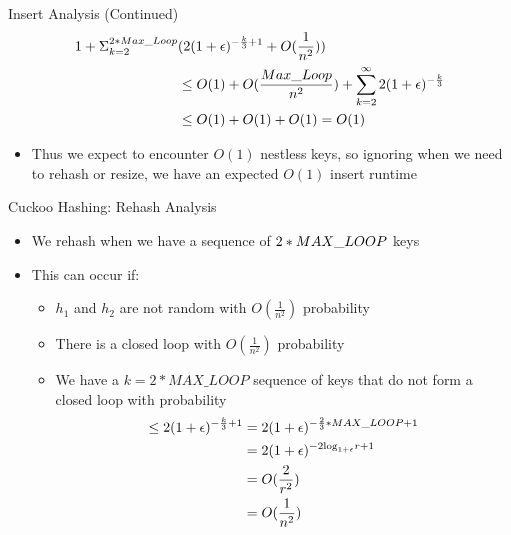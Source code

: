 \documentclass[aspectratio=169]{beamer}
\begin{document}
\begin{frame}{Insert Analysis (Continued)}
    \begin{align*}
        1 + \Sigma_{k = 2}^{2 * \emph{Max\_Loop}} &(2(1 + \epsilon)^{-\frac k 3 + 1} + O(\frac 1 {n^2})) \\
        &\le O(1) + O(\frac{\emph{Max\_Loop}}{n^2}) + \sum_{k = 2}^{\infty} 2(1 + \epsilon)^{-\frac k 3} \\
        &\le O(1) + O(1) + O(1) = O(1)
    \end{align*} \pause
    \begin{itemize}
        \item Thus we expect to encounter $O(1)$ nestless keys, so ignoring when we need to rehash or resize, we have an expected $O(1)$ insert runtime
    \end{itemize}
\end{frame}

\begin{frame}{Cuckoo Hashing: Rehash Analysis}
    \begin{itemize}
        \item We rehash when we have a sequence of $2 * \emph{MAX\_LOOP}$ keys
        \item This can occur if:
        \begin{itemize}
            \item $h_1$ and $h_2$ are not random with $O(\frac 1 {n^2})$ probability \pause
            \item There is a closed loop with $O(\frac 1 {n^2})$ probability \pause
            \item We have a $k = 2 * {MAX\_LOOP}$ sequence of keys that do not form a closed loop with probability
            \begin{align*}
                \le 2(1 + \epsilon)^{-\frac k 3 + 1} &= 2(1 + \epsilon)^{- \frac 2 3 * \emph{MAX\_LOOP} + 1} \\
                &= 2(1 + \epsilon)^{-2 \text{log}_{1 + \epsilon}r + 1} \\
                &= O(\frac 2 {r^2}) \\
                &= O(\frac 1 {n^2})
            \end{align*}
        \end{itemize}
    \end{itemize}
\end{frame}
\end{document}
